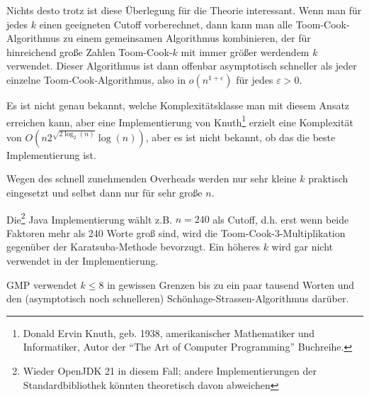 \begin{remark}
    Nichts desto trotz ist diese Überlegung für die Theorie interessant. Wenn man für jedes $k$ einen geeigneten Cutoff vorberechnet, dann kann man alle Toom-Cook-Algorithmus zu einem gemeinsamen Algorithmus kombinieren, der für hinreichend große Zahlen Toom-Cook-$k$ mit immer größer werdendem $k$ verwendet. Dieser Algorithmus ist dann offenbar asymptotisch schneller als jeder einzelne Toom-Cook-Algorithmus, also in $o(n^{1+\varepsilon})$ für jedes $\varepsilon>0$.

    \smallskip
    Es ist nicht genau bekannt, welche Komplexitätsklasse man mit diesem Ansatz erreichen kann, aber eine Implementierung von Knuth\footnote{Donald Ervin Knuth, geb. 1938, amerikanischer Mathematiker und Informatiker, Autor der \enquote{The Art of Computer Programming} Buchreihe.} erzielt eine Komplexität von $O(n 2^{\sqrt{2 \log_2(n)}} \log(n))$, aber es ist nicht bekannt, ob das die beste Implementierung ist.
\end{remark}

\begin{remark}
    Wegen des schnell zunehmenden Overheads werden nur sehr kleine $k$ praktisch eingesetzt und selbst dann nur für sehr große $n$.

    \smallskip
    Die\footnote{Wieder OpenJDK 21 in diesem Fall; andere Implementierungen der Standardbibliothek könnten theoretisch davon abweichen} Java Implementierung wählt z.B. $n=240$ als Cutoff, d.h. erst wenn beide Faktoren mehr als 240 Worte groß sind, wird die Toom-Cook-$3$-Multiplikation gegenüber der Karatsuba-Methode bevorzugt. Ein höheres $k$ wird gar nicht verwendet in der Implementierung.

    \smallskip
    GMP verwendet $k\leq 8$ in gewissen Grenzen bis zu ein paar tausend Worten und den (asymptotisch noch schnelleren) Schönhage-Strassen-Algorithmus darüber.
\end{remark}
